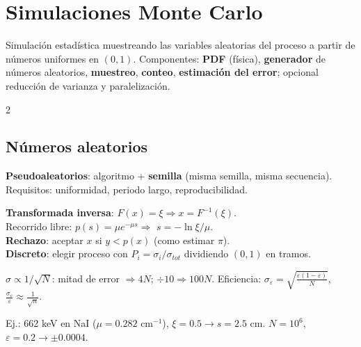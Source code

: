 \documentclass[10pt,a4paper]{article}
\newcommand{\imp}[1]{\textbf{\color{BrickRed}#1}}
\begin{document}
\section{Simulaciones Monte Carlo}
\begin{clave}[Definición]
Simulación estadística muestreando las variables aleatorias del proceso a partir de números uniformes en $(0,1)$.
Componentes: \textbf{PDF} (física), \textbf{generador} de números aleatorios, \textbf{muestreo}, \textbf{conteo}, \textbf{estimación del error}; opcional reducción de varianza y paralelización.
\end{clave}
\begin{multicols}{2}
\subsection{Números aleatorios}
\textbf{Pseudoaleatorios}: algoritmo + \textbf{semilla} (misma semilla, misma secuencia). Requisitos: uniformidad, periodo largo, reproducibilidad.
\begin{clave}[Muestreo]
\textbf{Transformada inversa}: $F(x)=\xi\Rightarrow x=F^{-1}(\xi)$.\\
Recorrido libre: $p(s)=\mu e^{-\mu s}\Rightarrow$ \imp{$s=-\ln\xi/\mu$}.\\
\textbf{Rechazo}: aceptar $x$ si $y<p(x)$ (como estimar $\pi$).\\
\textbf{Discreto}: elegir proceso con $P_i=\sigma_i/\sigma_{tot}$ dividiendo $(0,1)$ en tramos.
\end{clave}
\begin{clave}[Incertidumbre]
\imp{$\sigma\propto1/\sqrt N$}: mitad de error $\Rightarrow4N$; $\div10\Rightarrow100N$.
Eficiencia: $\displaystyle\sigma_\varepsilon=\sqrt{\frac{\varepsilon(1-\varepsilon)}{N}}$, $\displaystyle\frac{\sigma_\varepsilon}{\varepsilon}\approx\frac{1}{\sqrt n}$.
\end{clave}
Ej.: 662 keV en NaI ($\mu=0.282$ cm$^{-1}$), $\xi=0.5\to s=2.5$ cm. $N=10^6$, $\varepsilon=0.2\to\pm0.0004$.

\end{multicols}
\end{document}
